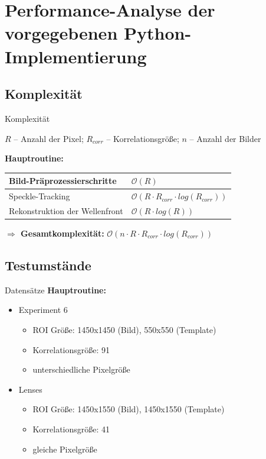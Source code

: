 
\section{Performance-Analyse der vorgegebenen Python-Implementierung}

\subsection{Komplexität}
\begin{frame}{Komplexität}
	\begin{center}
		$ R $ -- Anzahl der Pixel; $ R_{corr} $ -- Korrelationsgröße; $ n $ -- Anzahl der Bilder \\
	\end{center}
	\textbf{Hauptroutine:} \\
	\setlength\extrarowheight{5pt}
	\begin{center}
		\begin{tabular}{| >{\centering\arraybackslash}m{4cm} | >{\centering\arraybackslash}m{5cm} |}
			\hline
			Bild-Präprozessierschritte & $ \mathcal{O}(R) $ \\ \hline
			Speckle-Tracking & $ \mathcal{O}\left(R \cdot R_{corr} \cdot log\left(R_{corr}\right)\right)$ \\ \hline
			Rekonstruktion der Wellenfront & $ \mathcal{O}(R \cdot log(R)) $ \\ \hline
		\end{tabular}
	\end{center}
	\vspace{.5cm}
	\textbf{$ \Rightarrow $ Gesamtkomplexität:} $ \mathcal{O}\left(n \cdot R \cdot R_{corr} \cdot log\left(R_{corr}\right)\right)$
\end{frame}

\subsection{Testumstände}
\begin{frame}{Datensätze}
	\textbf{Hauptroutine:}
	\begin{itemize}
		\item<2-> Experiment 6
		\begin{itemize}
			\item ROI Größe: 1450x1450 (Bild), 550x550 (Template)
			\item Korrelationsgröße: 91
			\item unterschiedliche Pixelgröße
		\end{itemize}
		\item<3-> Lenses
		\begin{itemize}
			\item ROI Größe: 1450x1550 (Bild), 1450x1550 (Template)
			\item Korrelationsgröße: 41
			\item gleiche Pixelgröße
		\end{itemize}
	\end{itemize}
\end{frame}

